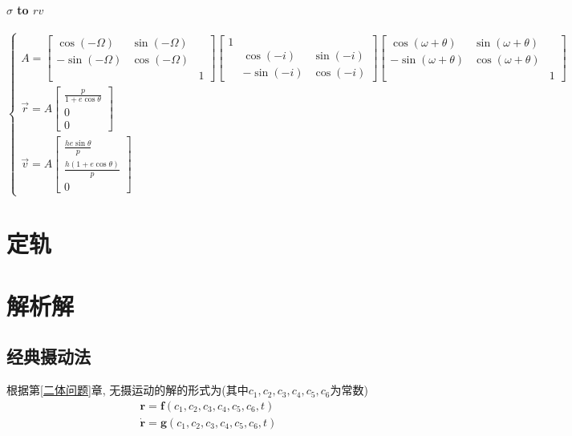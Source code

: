 \documentclass[UTF8]{ctexart}
\begin{document}
\paragraph{$\sigma$ to $rv$}
\begin{equation}
	\begin{cases}
			A=\begin{bmatrix}
			\cos(-\Omega) & \sin(-\Omega) & \\
			-\sin(-\Omega) & \cos(-\Omega) & \\
			& & 1
		\end{bmatrix}\begin{bmatrix}
			1 & &\\
			& \cos(-i) & \sin(-i)\\
			& -\sin(-i) & \cos(-i)
		\end{bmatrix}\begin{bmatrix}
			\cos(\omega+\theta) & \sin(\omega+\theta) & \\
			-\sin(\omega+\theta) & \cos(\omega+\theta) &\\
			& & 1
		\end{bmatrix}\\
		\vec{r}=A\begin{bmatrix}
			\frac{p}{1+e\cos\theta}\\
			0\\
			0
		\end{bmatrix}\\
		\vec{v}=A\begin{bmatrix}
		\frac{he\sin\theta}{p}\\
		\frac{h(1+e\cos\theta)}{p}\\
		0
		\end{bmatrix}
	\end{cases}
\end{equation}

\section{定轨}

\section{解析解}
\subsection{经典摄动法}
根据第\ref{二体问题}章, 无摄运动的解的形式为(其中$c_1,c_2,c_3,c_4,c_5,c_6$为常数)
\begin{gather}\label{eq:3.14}
	\boldsymbol{r}=\boldsymbol{f}(c_1,c_2,c_3,c_4,c_5,c_6,t)\\
	\label{eq:3.15}
	\dot{\boldsymbol{r}}=\boldsymbol{g}(c_1,c_2,c_3,c_4,c_5,c_6,t)
\end{gather}
\end{document}
